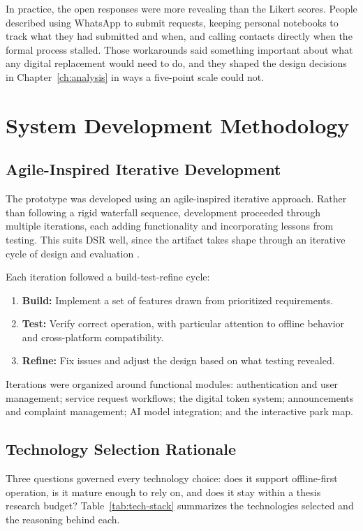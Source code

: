 In practice, the open responses were more revealing than the Likert scores. People described using WhatsApp to submit requests, keeping personal notebooks to track what they had submitted and when, and calling contacts directly when the formal process stalled. Those workarounds said something important about what any digital replacement would need to do, and they shaped the design decisions in Chapter~\ref{ch:analysis} in ways a five-point scale could not.

\section{System Development Methodology}

\subsection{Agile-Inspired Iterative Development}

The prototype was developed using an agile-inspired iterative approach. Rather than following a rigid waterfall sequence, development proceeded through multiple iterations, each adding functionality and incorporating lessons from testing. This suits DSR well, since the artifact takes shape through an iterative cycle of design and evaluation \citep{Hevner2004}.

Each iteration followed a build-test-refine cycle:
\begin{enumerate}
\item \textbf{Build:} Implement a set of features drawn from prioritized requirements.
\item \textbf{Test:} Verify correct operation, with particular attention to offline behavior and cross-platform compatibility.
\item \textbf{Refine:} Fix issues and adjust the design based on what testing revealed.
\end{enumerate}

Iterations were organized around functional modules: authentication and user management; service request workflows; the digital token system; announcements and complaint management; AI model integration; and the interactive park map.

\subsection{Technology Selection Rationale}

Three questions governed every technology choice: does it support offline-first operation, is it mature enough to rely on, and does it stay within a thesis research budget? Table~\ref{tab:tech-stack} summarizes the technologies selected and the reasoning behind each.

